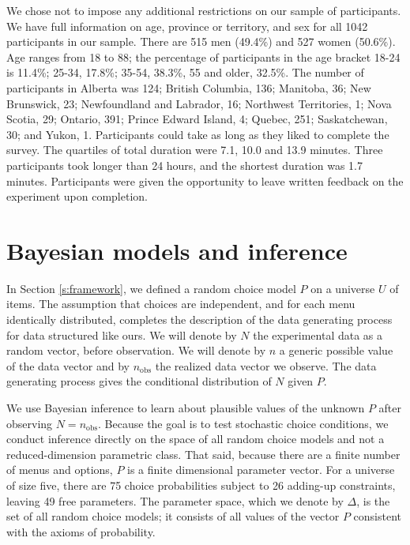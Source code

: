 \documentclass[11pt,letter]{article}
\newcommand{\menu}{menu}
\newcommand{\menus}{menus}
\begin{document}
We chose not to impose any additional restrictions on our sample of participants.
We have full information on age, province or territory, and sex for all 1042 participants in our sample.
There are 515 men (49.4\%) and 527 women (50.6\%).
Age ranges from 18 to 88; the percentage of participants in the age bracket 18-24 is 11.4\%; 25-34, 17.8\%; 35-54, 38.3\%, 55 and older, 32.5\%.
The number of participants in Alberta was 124; British Columbia, 136; Manitoba, 36; New Brunswick, 23; Newfoundland and Labrador, 16; Northwest Territories, 1; Nova Scotia, 29; Ontario, 391; Prince Edward Island, 4; Quebec, 251; Saskatchewan, 30; and Yukon, 1.
Participants could take as long as they liked to complete the survey.
The quartiles of total duration were 7.1, 10.0 and 13.9 minutes.
Three participants took longer than 24 hours, and the shortest duration was 1.7 minutes.
Participants were given the opportunity to leave written feedback on the experiment upon completion.

\section{Bayesian models and inference}\label{s:models}

In Section \ref{s:framework}, we defined a random choice model $P$ on a universe $U$ of items.
The assumption that choices are independent, and for each \menu{} identically distributed, completes the description of the data generating process for data structured like ours.
We will denote by $N$ the experimental data as a random vector, before observation.
We will denote by $n$ a generic possible value of the data vector and by $n_{\mathrm{obs}}$ the realized data vector we observe.
The data generating process gives the conditional distribution of $N$ given $P$.

We use Bayesian inference to learn about plausible values of the unknown $P$ after observing $N = n_{\mathrm{obs}}$.
Because the goal is to test stochastic choice conditions, we conduct inference directly on the space of all random choice models and not a reduced-dimension parametric class.
That said, because there are a finite number of \menus{} and options, $P$ is a finite dimensional parameter vector.
For a universe of size five, there are 75 choice probabilities subject to 26 adding-up constraints, leaving 49 free parameters.
The parameter space, which we denote by $\Delta$, is the set of all random choice models; it consists of all values of the vector $P$ consistent with the axioms of probability.
\end{document}
